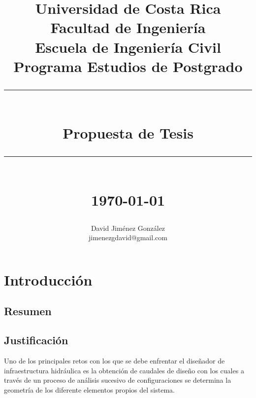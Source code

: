 \documentclass[12pt]{report}
\newcommand{\HRule}[1]{\rule{\linewidth}{#1}}
\begin{document}
\title{ \normalsize Universidad de Costa Rica \\
		Facultad de Ingeniería\\
        Escuela de Ingeniería Civil\\
		Programa Estudios de Postgrado
		\\ [2.0cm]
		\HRule{2pt} \\
		\LARGE \textbf{Propuesta de Tesis} %
		\HRule{2pt} \\ [0.5cm]
		\normalsize \today \vspace*{5\baselineskip}}

\date{}

\author{
		David Jiménez González \\ 
		 jimenezgdavid@gmail.com}
\maketitle

\tableofcontents
\newpage



\chapter{Introducción}
\section{Resumen}


\section{Justificación}
Uno de los principales retos con los que se debe enfrentar el diseñador de infraestructura hidráulica es la obtención de caudales de diseño con los cuales a través de un proceso de análisis sucesivo de configuraciones se determina la geometría de los diferente elementos propios del sistema.
\end{document}

